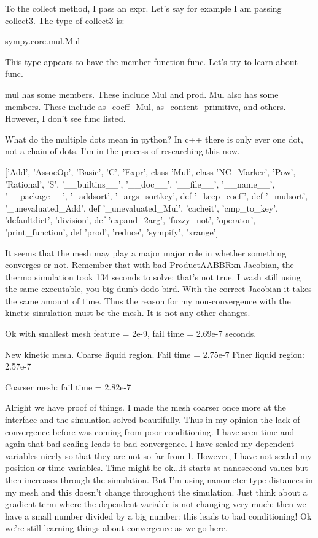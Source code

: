 {To the collect method, I pass an expr. Let's say for example I am passing collect3. The type of collect3 is:

sympy.core.mul.Mul

This type appears to have the member function func. Let's try to learn about func.

mul has some members. These include Mul and prod. Mul also has some members. These include as_coeff_Mul, as_content_primitive, and others. However, I don't see func listed.

What do the multiple dots mean in python? In c++ there is only ever one dot, not a chain of dots. I'm in the process of researching this now.

['Add',
 'AssocOp',
 'Basic',
 'C',
 'Expr',
class 'Mul',
class 'NC_Marker',
 'Pow',
 'Rational',
 'S',
 '__builtins__',
 '__doc__',
 '__file__',
 '__name__',
 '__package__',
 '_addsort',
 '_args_sortkey',
def '_keep_coeff',
def '_mulsort',
 '_unevaluated_Add',
def '_unevaluated_Mul',
 'cacheit',
 'cmp_to_key',
 'defaultdict',
 'division',
def 'expand_2arg',
 'fuzzy_not',
 'operator',
 'print_function',
def 'prod',
 'reduce',
 'sympify',
 'xrange']

It seems that the mesh may play a major major role in whether something converges or not. Remember that with bad ProductAABBRxn Jacobian, the thermo simulation took 134 seconds to solve: that's not true. I wash still using the same executable, you big dumb dodo bird. With the correct Jacobian it takes the same amount of time. Thus the reason for my non-convergence with the kinetic simulation must be the mesh. It is not any other changes.

Ok with smallest mesh feature = 2e-9, fail time = 2.69e-7 seconds.

New kinetic mesh. Coarse liquid region. Fail time = 2.75e-7
Finer liquid region: 2.57e-7

Coarser mesh: fail time = 2.82e-7

Alright we have proof of things. I made the mesh coarser once more at the interface and the simulation solved beautifully. Thus in my opinion the lack of convergence before was coming from poor conditioning. I have seen time and again that bad scaling leads to bad convergence. I have scaled my dependent variables nicely so that they are not so far from 1. However, I have not scaled my position or time variables. Time might be ok...it starts at nanosecond values but then increases through the simulation. But I'm using nanometer type distances in my mesh and this doesn't change throughout the simulation. Just think about a gradient term where the dependent variable is not changing very much: then we have a small number divided by a big number: this leads to bad conditioning! Ok we're still learning things about convergence as we go here.

}
